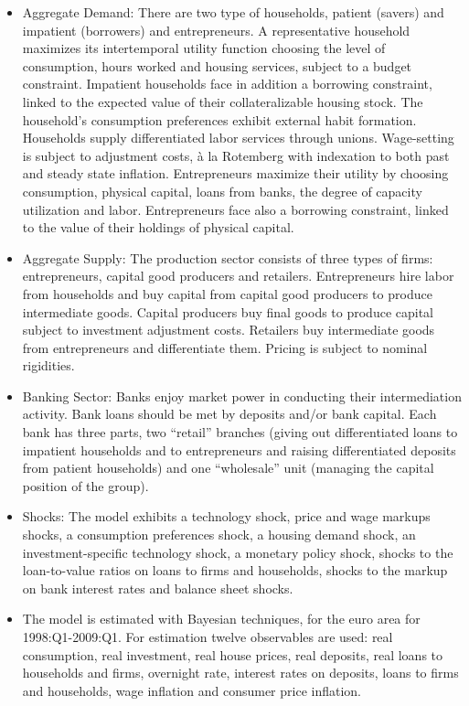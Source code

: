 \documentclass[11pt,a4paper]{article}
\begin{document}
	\begin{itemize}
		\item Aggregate Demand: There are two type of households, patient (savers) and impatient (borrowers) and entrepreneurs. A representative household maximizes its intertemporal utility function choosing the level of consumption, hours worked and housing services, subject to a budget constraint. Impatient households face in addition a borrowing constraint, linked to the expected value of their collateralizable housing stock. The household's consumption preferences exhibit external habit formation.
		Households supply differentiated labor services through unions. Wage-setting is subject to adjustment costs, \`{a} la Rotemberg with indexation to both past and steady state inflation. Entrepreneurs maximize their utility by choosing consumption, physical capital, loans from banks, the degree of capacity utilization and labor. Entrepreneurs face also a borrowing constraint, linked to the value of their holdings of physical capital.
		
		\item Aggregate Supply: The production sector consists of three types of firms: entrepreneurs, capital good producers and retailers. Entrepreneurs hire labor from households and buy capital from capital good producers to produce intermediate goods. Capital producers buy final goods to produce capital subject to investment adjustment costs. Retailers buy intermediate goods from entrepreneurs and differentiate them. Pricing is subject to nominal rigidities.
		
		\item Banking Sector: Banks enjoy market power in conducting their intermediation activity. Bank loans should be met by deposits and/or bank capital. Each bank has three parts, two ``retail'' branches (giving out differentiated loans to impatient households and to entrepreneurs and raising differentiated deposits from patient households) and one ``wholesale'' unit (managing the capital position of the group).
		
		\item Shocks: The model exhibits a technology shock, price and wage markups shocks, a consumption preferences shock, a housing demand shock, an investment-specific technology shock, a monetary policy shock, shocks to the loan-to-value ratios on loans to firms and households, shocks to the markup on bank interest rates and balance sheet shocks.
		
		\item The model is estimated with Bayesian techniques, for the euro area for 1998:Q1-2009:Q1. For estimation twelve observables are used: real consumption, real investment, real house prices, real deposits, real loans to households and firms, overnight rate, interest rates on deposits, loans to firms and households, wage inflation and consumer price inflation.
	\end{itemize}
	
\end{document}
